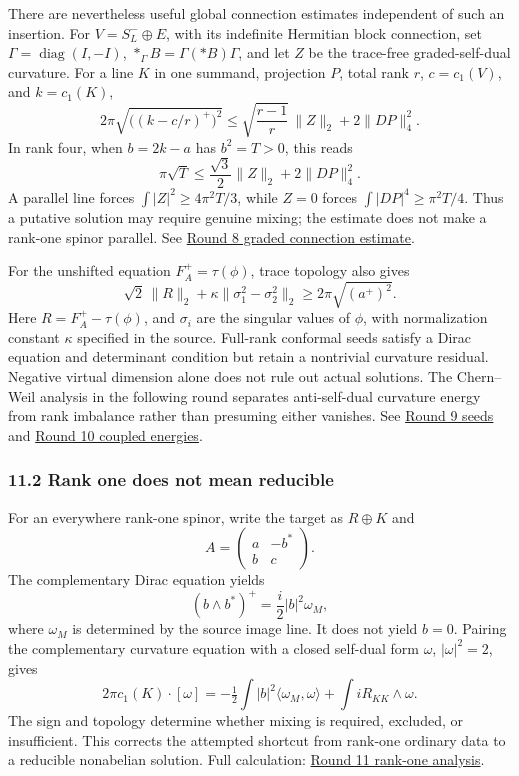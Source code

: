 \documentclass[
  english,
]{article}
\begin{document}
There are nevertheless useful global connection estimates independent of
such an insertion. For \(V=S_L^-\oplus E\), with its indefinite
Hermitian block connection, set \(\Gamma=\operatorname{diag}(I,-I)\),
\(*_\Gamma B=\Gamma(*B)\Gamma\), and let \(Z\) be the trace-free
graded-self-dual curvature. For a line \(K\) in one summand, projection
\(P\), total rank \(r\), \(c=c_1(V)\), and \(k=c_1(K)\), \[
 2\pi\sqrt{\bigl((k-c/r)^+\bigr)^2}
 \le\sqrt{\frac{r-1}{r}}\,\|Z\|_2+2\|DP\|_4^2.
\] In rank four, when \(b=2k-a\) has \(b^2=T>0\), this reads \[
 \pi\sqrt T\le\frac{\sqrt3}{2}\|Z\|_2+2\|DP\|_4^2.
\] A parallel line forces \(\int|Z|^2\ge4\pi^2T/3\), while \(Z=0\)
forces \(\int|DP|^4\ge\pi^2T/4\). Thus a putative solution may require
genuine mixing; the estimate does not make a rank-one spinor parallel.
See \href{../proofs/round8_nonabelian.md}{Round 8 graded connection
estimate}.

For the unshifted equation \(F_A^+=\tau(\phi)\), trace topology also
gives \[
 \sqrt2\,\|R\|_2+\kappa\|\sigma_1^2-\sigma_2^2\|_2
       \ge2\pi\sqrt{(a^+)^2}.
\] Here \(R=F_A^+-\tau(\phi)\), and \(\sigma_i\) are the singular values
of \(\phi\), with normalization constant \(\kappa\) specified in the
source. Full-rank conformal seeds satisfy a Dirac equation and
determinant condition but retain a nontrivial curvature residual.
Negative virtual dimension alone does not rule out actual solutions. The
Chern--Weil analysis in the following round separates anti-self-dual
curvature energy from rank imbalance rather than presuming either
vanishes. See \href{../proofs/round9_nonabelian.md}{Round 9 seeds} and
\href{../proofs/round10_nonabelian.md}{Round 10 coupled energies}.

\hypertarget{rank-one-does-not-mean-reducible}{%
\subsubsection{11.2 Rank one does not mean
reducible}\label{rank-one-does-not-mean-reducible}}

For an everywhere rank-one spinor, write the target as \(R\oplus K\) and
\[
 A=\begin{pmatrix}a&-b^*\\b&c\end{pmatrix}.
\] The complementary Dirac equation yields \[
 (b\wedge b^*)^+=\frac{i}{2}|b|^2\omega_M,
\] where \(\omega_M\) is determined by the source image line. It does
not yield \(b=0\). Pairing the complementary curvature equation with a
closed self-dual form \(\omega\), \(|\omega|^2=2\), gives \[
 2\pi c_1(K)\cdot[\omega]
 =-\tfrac12\int|b|^2\langle\omega_M,\omega\rangle
       +\int iR_{KK}\wedge\omega.
\] The sign and topology determine whether mixing is required, excluded,
or insufficient. This corrects the attempted shortcut from rank-one
ordinary data to a reducible nonabelian solution. Full calculation:
\href{../proofs/round11_rankone.md}{Round 11 rank-one analysis}.
\end{document}
